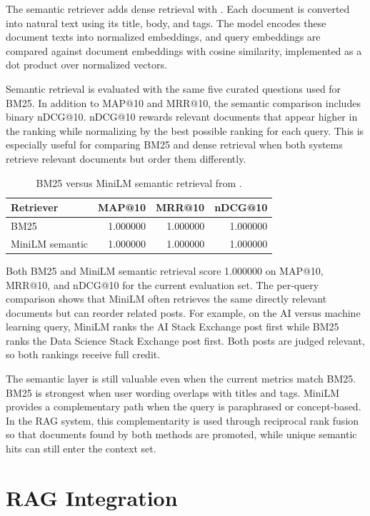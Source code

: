 \documentclass[11pt]{article}
\begin{document}
The semantic retriever adds dense retrieval with . Each document is converted into natural text using its title, body, and tags. The model encodes these document texts into normalized embeddings, and query embeddings are compared against document embeddings with cosine similarity, implemented as a dot product over normalized vectors.

Semantic retrieval is evaluated with the same five curated questions used for BM25. In addition to MAP@10 and MRR@10, the semantic comparison includes binary nDCG@10. nDCG@10 rewards relevant documents that appear higher in the ranking while normalizing by the best possible ranking for each query. This is especially useful for comparing BM25 and dense retrieval when both systems retrieve relevant documents but order them differently.

\begin{table}[h]
\centering
\begin{tabular}{lrrr}
\toprule
Retriever & MAP@10 & MRR@10 & nDCG@10 \\
\midrule
BM25 & 1.000000 & 1.000000 & 1.000000 \\
MiniLM semantic & 1.000000 & 1.000000 & 1.000000 \\
\bottomrule
\end{tabular}
\caption{BM25 versus MiniLM semantic retrieval from .}
\end{table}

Both BM25 and MiniLM semantic retrieval score 1.000000 on MAP@10, MRR@10, and nDCG@10 for the current evaluation set. The per-query comparison shows that MiniLM often retrieves the same directly relevant documents but can reorder related posts. For example, on the AI versus machine learning query, MiniLM ranks the AI Stack Exchange post first while BM25 ranks the Data Science Stack Exchange post first. Both posts are judged relevant, so both rankings receive full credit.

The semantic layer is still valuable even when the current metrics match BM25. BM25 is strongest when user wording overlaps with titles and tags. MiniLM provides a complementary path when the query is paraphrased or concept-based. In the RAG system, this complementarity is used through reciprocal rank fusion so that documents found by both methods are promoted, while unique semantic hits can still enter the context set.

\section{RAG Integration}
\end{document}
